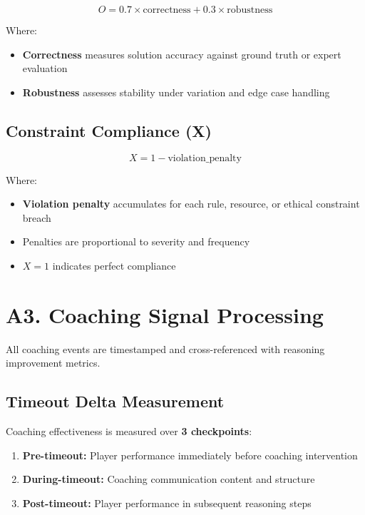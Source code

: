 \begin{equation}
O = 0.7 \times \text{correctness} + 0.3 \times \text{robustness}
\end{equation}

Where:
\begin{itemize}[leftmargin=*]
  \item \textbf{Correctness} measures solution accuracy against ground truth or expert evaluation
  \item \textbf{Robustness} assesses stability under variation and edge case handling
\end{itemize}

\subsection{Constraint Compliance (X)}

\begin{equation}
X = 1 - \text{violation\_penalty}
\end{equation}

Where:
\begin{itemize}[leftmargin=*]
  \item \textbf{Violation penalty} accumulates for each rule, resource, or ethical constraint breach
  \item Penalties are proportional to severity and frequency
  \item $X = 1$ indicates perfect compliance
\end{itemize}

\section{A3. Coaching Signal Processing}

All coaching events are timestamped and cross-referenced with reasoning improvement metrics.

\subsection{Timeout Delta Measurement}

Coaching effectiveness is measured over \textbf{3 checkpoints}:
\begin{enumerate}
  \item \textbf{Pre-timeout:} Player performance immediately before coaching intervention
  \item \textbf{During-timeout:} Coaching communication content and structure
  \item \textbf{Post-timeout:} Player performance in subsequent reasoning steps
\end{enumerate}

